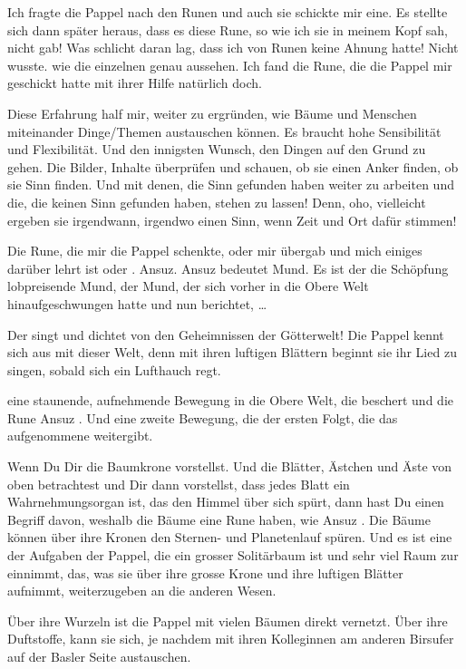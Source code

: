 \documentclass[11pt,titlepage,a5paper]{book}
\begin{document}
Ich fragte die Pappel nach den Runen und auch sie schickte mir eine. Es stellte sich dann später heraus, dass es diese Rune, so wie ich sie in meinem Kopf sah, nicht gab! Was schlicht daran lag, dass ich von Runen keine Ahnung hatte! Nicht wusste. wie die einzelnen genau aussehen. Ich fand die Rune, die die Pappel mir geschickt hatte mit ihrer Hilfe natürlich doch.

Diese Erfahrung half mir, weiter zu ergründen, wie Bäume und Menschen miteinander Dinge/Themen austauschen können. Es braucht hohe Sensibilität und Flexibilität. Und den innigsten Wunsch, den Dingen auf den Grund zu gehen. Die Bilder, Inhalte überprüfen und schauen, ob sie einen Anker finden, ob sie Sinn finden. Und mit denen, die Sinn gefunden haben weiter zu arbeiten und die, die keinen Sinn gefunden haben, stehen zu lassen! Denn, oho, vielleicht ergeben sie irgendwann, irgendwo einen Sinn, wenn Zeit und Ort dafür stimmen!

Die Rune, die mir die Pappel schenkte, oder mir übergab und mich einiges darüber lehrt ist  oder . Ansuz. Ansuz bedeutet Mund. Es ist der die Schöpfung lobpreisende Mund, der Mund, der sich vorher in die Obere Welt hinaufgeschwungen hatte und nun berichtet, \dots

Der singt und dichtet von den Geheimnissen der Götterwelt! Die Pappel kennt sich aus mit dieser Welt, denn mit ihren luftigen Blättern beginnt sie ihr Lied zu singen, sobald sich ein Lufthauch regt.

eine staunende, aufnehmende Bewegung in die Obere Welt, die beschert und die Rune Ansuz . Und eine zweite Bewegung, die der ersten Folgt, die das aufgenommene weitergibt.

Wenn Du Dir die Baumkrone vorstellst. Und die Blätter, Ästchen und Äste von oben betrachtest und Dir dann vorstellst, dass jedes Blatt ein Wahrnehmungsorgan ist, das den Himmel über sich spürt, dann hast Du einen Begriff davon, weshalb die Bäume eine Rune haben, wie Ansuz . Die Bäume können über ihre Kronen den Sternen- und Planetenlauf spüren. Und es ist eine der Aufgaben der  Pappel, die ein grosser Solitärbaum ist und sehr viel Raum zur einnimmt, das, was sie über ihre grosse Krone und ihre luftigen Blätter aufnimmt, weiterzugeben an die anderen Wesen.

Über ihre Wurzeln ist die Pappel mit vielen Bäumen direkt vernetzt. Über ihre Duftstoffe, kann sie sich, je nachdem mit ihren Kolleginnen am anderen Birsufer auf der Basler Seite austauschen.
\end{document}

